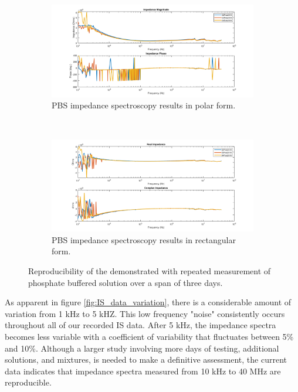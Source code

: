 \begin{figure}[h]
    \centering
    \begin{subfigure}[b]{\textwidth}
        \centering
        \includegraphics[width=\textwidth]{images/reproducibility_PBS_mag_phase.png}
        \caption{PBS impedance spectroscopy results in polar form.}
    \end{subfigure}
    \\
    \vspace{0.1 in}
    \begin{subfigure}[b]{\textwidth}
        \centering
        \includegraphics[width=\textwidth]{images/reproducibility_PBS_real_imag.png}
        \caption{PBS impedance spectroscopy results in rectangular form.}
    \end{subfigure}
    \caption{Reproducibility of the demonstrated with repeated measurement of phosphate buffered solution over a span of three days.}
    \label{fig:IS_data_reproducibility}
\end{figure}

\par As apparent in figure \ref{fig:IS_data_variation}, there is a considerable amount of variation from 1 kHz to 5 kHZ. This low frequency "noise" consistently occurs throughout all of our recorded IS data. After 5 kHz, the impedance spectra becomes less variable with a coefficient of variability that fluctuates between 5\% and 10\%. Although a larger study involving more days of testing, additional solutions, and mixtures, is needed to make a definitive assessment, the current data indicates that impedance spectra measured from 10 kHz to 40 MHz are reproducible.


